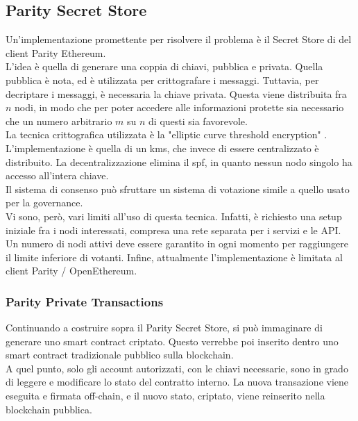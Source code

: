 \documentclass[12pt, letterpaper, twoside]{article}
\begin{document}
\subsection{Parity Secret Store}
Un'implementazione promettente per risolvere il problema è il Secret Store di del client Parity Ethereum. \\
L'idea è quella di generare una coppia di chiavi, pubblica e privata. 
Quella pubblica è nota, ed è utilizzata per crittografare i messaggi.
Tuttavia, per decriptare i messaggi, è necessaria la chiave privata.
Questa viene distribuita fra $n$ nodi, in modo che per poter accedere alle informazioni protette sia necessario che un numero arbitrario $m$ su $n$ di questi sia favorevole. \\
La tecnica crittografica utilizzata è la "elliptic curve threshold encryption" \cite{art:ecdkg}. \\
L'implementazione è quella di un \gls{kms}, che invece di essere centralizzato è distribuito.
La decentralizzazione elimina il \gls{spf}, in quanto nessun nodo singolo ha accesso all'intera chiave. \\
Il sistema di consenso può sfruttare un sistema di votazione simile a quello usato per la governance. \\
Vi sono, però, vari limiti all'uso di questa tecnica. 
Infatti, è richiesto una setup iniziale fra i nodi interessati, compresa una rete separata per i servizi e le API.
Un numero di nodi attivi deve essere garantito in ogni momento per raggiungere il limite inferiore di votanti.
Infine, attualmente l'implementazione è limitata al client Parity / OpenEthereum.

\subsubsection{Parity Private Transactions}
Continuando a costruire sopra il Parity Secret Store, si può immaginare di generare uno smart contract criptato.
Questo verrebbe poi inserito dentro uno smart contract tradizionale pubblico sulla blockchain. \\
A quel punto, solo gli account autorizzati, con le chiavi necessarie, sono in grado di leggere e modificare lo stato del contratto interno.
La nuova transazione viene eseguita e firmata off-chain, e il nuovo stato, criptato, viene reinserito nella blockchain pubblica.
\end{document}
